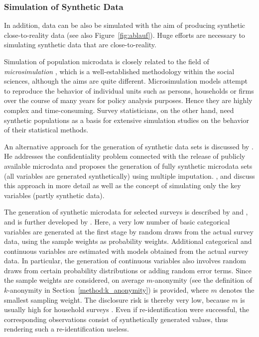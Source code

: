 \documentclass[12pt]{article}
\begin{document}
\subsubsection{Simulation of Synthetic Data}

In addition, data can be also be simulated with the aim of producing 
synthetic close-to-reality data (see also Figure~\ref{fig:ablauf}).
Huge efforts are necessary to simulating synthetic data that are close-to-reality. 

Simulation of population microdata is closely related to the field of
\emph{microsimulation} \citep[e.g.,][]{clarke96}, which is a well-established
methodology within the social sciences, although the aims are quite different.
Microsimulation models attempt to reproduce the behavior of individual units
such as persons, households or firms over the course of many years for policy
\mbox{analysis} purposes. Hence they are highly complex and time-consuming.
Survey statisticians, on the other hand, need synthetic populations as a basis
for extensive simulation studies on the behavior of their statistical methods.

An alternative approach for the generation of synthetic data sets is discussed
by \citet{rubin93}. He addresses the confidentiality problem connected with the
release of publicly available microdata and proposes the generation of fully
synthetic microdata sets (all variables are generated synthetically) 
using multiple imputation. \citet{raghunathan03},
\citet{Drechsler08} and \citet{Reiter09} discuss this approach in more detail as well as
the concept of simulating only the key variables (partly synthetic data).

The generation of synthetic microdata for selected surveys  
is described by \citet{muennich03a} and
\citet{muennich03bsim}, and is further developed by
\citet{alfons11b}. 
Here, a very low number of basic categorical variables are
generated at the first stage by random draws from the actual survey data,
using the sample weights as probability weights. Additional categorical and
continuous variables are estimated with models obtained from the actual survey
data. In particular, the generation of continuous variables also involves
random draws from certain probability distributions or adding random error
terms. Since the sample weights are considered, on average \mbox{$m$-anonymity} (see the definition of
$k$-anonymity in Section~\ref{method:k_anonymity})
is provided, where $m$ denotes the smallest sampling weight. The disclosure
risk is thereby very low, because $m$ is usually high for household surveys 
\citep[for details, see, ][]{Templ10riskPop}.
Even if re-identification were successful, the corresponding observations
consist of synthetically generated values, thus rendering such a
re-identification useless.
\end{document}
